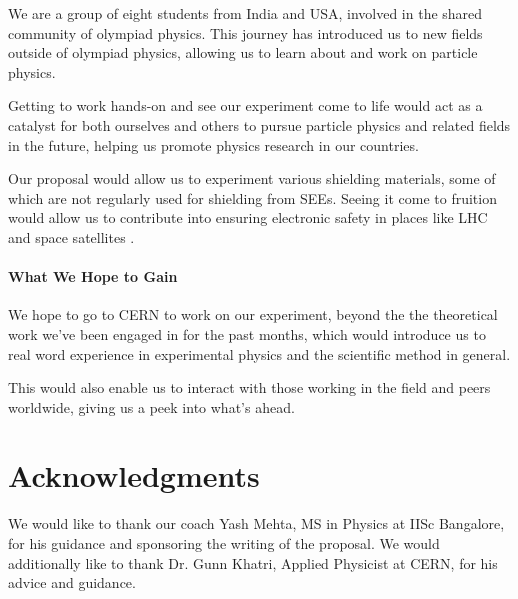 \documentclass{article}
\begin{document}
We are a group of eight students from India and USA, involved in the shared community of olympiad physics. 
This journey has introduced us to new fields outside of olympiad physics, allowing us to learn about and work on 
particle physics.

Getting to work hands-on and see our experiment come to life would act as a catalyst for both ourselves and others
to pursue particle physics and related fields in the future, helping us promote physics research in our countries.

Our proposal would allow us to experiment various shielding materials, some of which are not regularly used for shielding
from SEEs. Seeing it come to fruition would allow us to contribute into 
ensuring electronic safety in places like LHC and space satellites .

\subsection*{What We Hope to Gain}

We hope to go to CERN to work on our experiment, beyond the the theoretical work we've been engaged in for the 
past months, which would introduce us to real word experience in experimental physics and the scientific method in general.  

This would also enable us to interact with those working in the field and peers worldwide, giving us a peek into what's ahead.

\vspace{-3em}
\part*{Acknowledgments}

We would like to thank our coach Yash Mehta, MS in Physics at IISc Bangalore, for his guidance and sponsoring the writing of the proposal.
We would additionally like to thank Dr. Gunn Khatri, Applied Physicist at CERN, for his advice and guidance.

\newpage
\vspace*{-5.5em}

\end{document}
